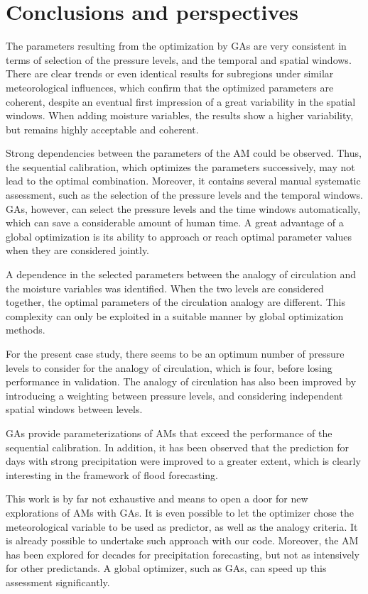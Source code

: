 \documentclass[review]{elsarticle}
\begin{document}
\section{Conclusions and perspectives}
\label{sec:conclusions}


The parameters resulting from the optimization by GAs are very consistent in terms of selection of the pressure levels, and the temporal and spatial windows. There are clear trends or even identical results for subregions under similar meteorological influences, which confirm that the optimized parameters are coherent, despite an eventual first impression of a great variability in the spatial windows. When adding moisture variables, the results show a higher variability, but remains highly acceptable and coherent.

Strong dependencies between the parameters of the AM could be observed. Thus, the sequential calibration, which optimizes the parameters successively, may not lead to the optimal combination. Moreover, it contains several manual systematic assessment, such as the selection of the pressure levels and the temporal windows. GAs, however, can select the pressure levels and the time windows automatically, which can save a considerable amount of human time. A great advantage of a global optimization is its ability to approach or reach optimal parameter values when they are considered jointly. 

A dependence in the selected parameters between the analogy of circulation and the moisture variables was identified. When the two levels are considered together, the optimal parameters of the circulation analogy are different. This complexity can only be exploited in a suitable manner by global optimization methods.

For the present case study, there seems to be an optimum number of pressure levels to consider for the analogy of circulation, which is four, before losing performance in validation. The analogy of circulation has also been improved by introducing a weighting between pressure levels, and considering independent spatial windows between levels.

GAs provide parameterizations of AMs that exceed the performance of the sequential calibration. In addition, it has been observed that the prediction for days with strong precipitation were improved to a greater extent, which is clearly interesting in the framework of flood forecasting.

This work is by far not exhaustive and means to open a door for new explorations of AMs with GAs. It is even possible to let the optimizer chose the meteorological variable to be used as predictor, as well as the analogy criteria. It is already possible to undertake such approach with our code. Moreover, the AM has been explored for decades for precipitation forecasting, but not as intensively for other predictands. A global optimizer, such as GAs, can speed up this assessment significantly.
\end{document}
